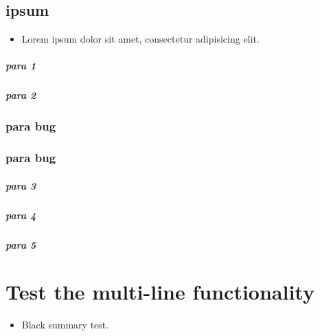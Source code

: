 \section{ipsum}
\label{autosec:4}
    \begin{itemize}[noitemsep]
        \item Lorem ipsum dolor sit amet, consectetur adipisicing elit.
    \end{itemize}
\paragraph{para 1}
\label{autosec:5}
\paragraph{para 2}
\label{autosec:5}
\subsection{para bug}
\label{autosec:5}
\vspace{-36pt}\hspace{11pt}
\subsection{para bug}
\label{autosec:6}
\vspace{-36pt}\hspace{11pt}
\paragraph{para 3}
\label{autosec:7}
\paragraph{para 4}
\label{autosec:7}
\paragraph{para 5}
\label{autosec:7}
\chapter{Test the multi-line functionality}
\label{autosec:7}
    \begin{itemize}[noitemsep]
        \item Black summary test.
    \end{itemize}
